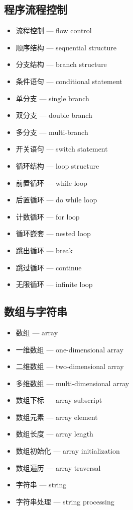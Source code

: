 \subsection{程序流程控制}
\begin{itemize}
\item 流程控制 — flow control
\item 顺序结构 — sequential structure
\item 分支结构 — branch structure
\item 条件语句 — conditional statement
\item 单分支 — single branch
\item 双分支 — double branch
\item 多分支 — multi-branch
\item 开关语句 — switch statement
\item 循环结构 — loop structure
\item 前置循环 — while loop
\item 后置循环 — do while loop
\item 计数循环 — for loop
\item 循环嵌套 — nested loop
\item 跳出循环 — break
\item 跳过循环 — continue
\item 无限循环 — infinite loop
\end{itemize}

\subsection{数组与字符串}
\begin{itemize}
\item 数组 — array
\item 一维数组 — one-dimensional array
\item 二维数组 — two-dimensional array
\item 多维数组 — multi-dimensional array
\item 数组下标 — array subscript
\item 数组元素 — array element
\item 数组长度 — array length
\item 数组初始化 — array initialization
\item 数组遍历 — array traversal
\item 字符串 — string
\item 字符串处理 — string processing
\end{itemize}

